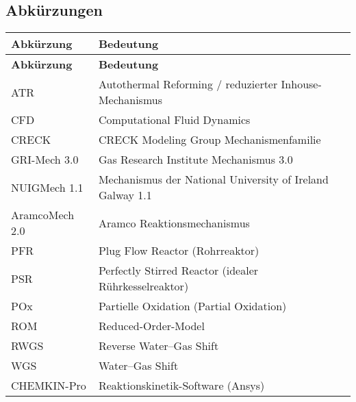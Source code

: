 \subsection*{Abkürzungen}
\begin{small}
\begin{flushleft}
\begin{longtable}{@{}ll@{}}
\toprule
\textbf{Abkürzung} & \textbf{Bedeutung} \\
\midrule
\endfirsthead
\toprule
\textbf{Abkürzung} & \textbf{Bedeutung} \\
\midrule
\endhead
\bottomrule
\endlastfoot
ATR                 & Autothermal Reforming / reduzierter Inhouse-Mechanismus \\
CFD                 & Computational Fluid Dynamics \\
CRECK               & CRECK Modeling Group Mechanismenfamilie \\
GRI-Mech 3.0        & Gas Research Institute Mechanismus 3.0 \\
NUIGMech 1.1        & Mechanismus der National University of Ireland Galway 1.1 \\
AramcoMech 2.0      & Aramco Reaktionsmechanismus \\
PFR                 & Plug Flow Reactor (Rohrreaktor) \\
PSR                 & Perfectly Stirred Reactor (idealer Rührkesselreaktor) \\
POx                 & Partielle Oxidation (Partial Oxidation) \\
ROM                 & Reduced-Order-Model \\
RWGS                & Reverse Water–Gas Shift \\
WGS                 & Water–Gas Shift \\
CHEMKIN-Pro         & Reaktionskinetik-Software (Ansys) \\
\end{longtable}
\end{flushleft}
\end{small}
